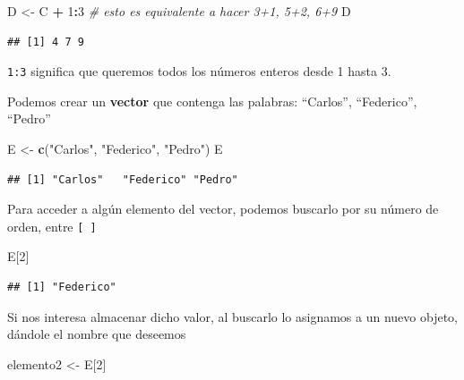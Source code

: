 \documentclass[]{book}
\newenvironment{Shaded}{\begin{snugshade}}{\end{snugshade}}
\newcommand{\CommentTok}[1]{\textcolor[rgb]{0.56,0.35,0.01}{\textit{#1}}}
\newcommand{\DecValTok}[1]{\textcolor[rgb]{0.00,0.00,0.81}{#1}}
\newcommand{\KeywordTok}[1]{\textcolor[rgb]{0.13,0.29,0.53}{\textbf{#1}}}
\newcommand{\NormalTok}[1]{#1}
\newcommand{\OperatorTok}[1]{\textcolor[rgb]{0.81,0.36,0.00}{\textbf{#1}}}
\newcommand{\StringTok}[1]{\textcolor[rgb]{0.31,0.60,0.02}{#1}}
\begin{document}
\begin{Shaded}
\begin{Highlighting}[]
\NormalTok{D <-}\StringTok{ }\NormalTok{C }\OperatorTok{+}\StringTok{ }\DecValTok{1}\OperatorTok{:}\DecValTok{3} \CommentTok{# esto es equivalente a hacer 3+1, 5+2, 6+9 }
\NormalTok{D}
\end{Highlighting}
\end{Shaded}

\begin{verbatim}
## [1] 4 7 9
\end{verbatim}

\texttt{1:3} significa que queremos todos los números enteros desde 1 hasta 3.

Podemos crear un \textbf{vector} que contenga las palabras: ``Carlos'', ``Federico'', ``Pedro''

\begin{Shaded}
\begin{Highlighting}[]
\NormalTok{E <-}\StringTok{ }\KeywordTok{c}\NormalTok{(}\StringTok{"Carlos"}\NormalTok{, }\StringTok{"Federico"}\NormalTok{, }\StringTok{"Pedro"}\NormalTok{)}
\NormalTok{E}
\end{Highlighting}
\end{Shaded}

\begin{verbatim}
## [1] "Carlos"   "Federico" "Pedro"
\end{verbatim}

Para acceder a algún elemento del vector, podemos buscarlo por su número de orden, entre \texttt{{[}\ {]}}

\begin{Shaded}
\begin{Highlighting}[]
\NormalTok{E[}\DecValTok{2}\NormalTok{]}
\end{Highlighting}
\end{Shaded}

\begin{verbatim}
## [1] "Federico"
\end{verbatim}

Si nos interesa almacenar dicho valor, al buscarlo lo asignamos a un nuevo objeto, dándole el nombre que deseemos

\begin{Shaded}
\begin{Highlighting}[]
\NormalTok{elemento2 <-}\StringTok{ }\NormalTok{E[}\DecValTok{2}\NormalTok{]}
\end{Highlighting}
\end{Shaded}
\end{document}
